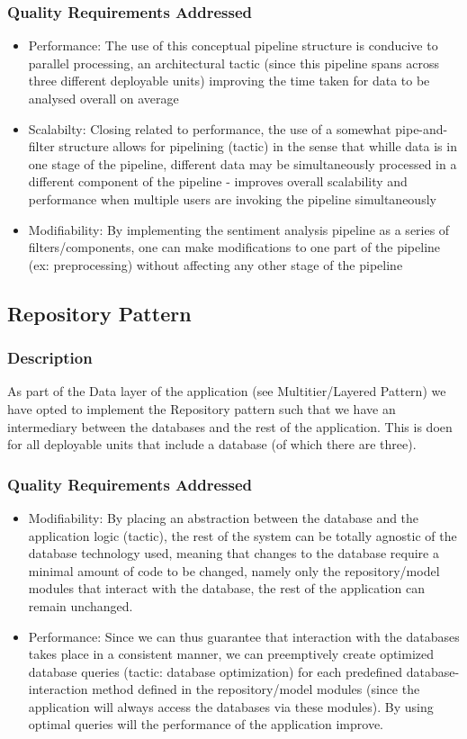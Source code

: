 \documentclass[12pt]{article}
\begin{document}
\subsubsection{Quality Requirements Addressed}
\begin{itemize}
    \item Performance: The use of this conceptual pipeline structure is conducive to parallel processing, an architectural tactic (since this pipeline spans across three different deployable units) improving the time taken for data to be analysed overall on average
    \item Scalabilty: Closing related to performance, the use of a somewhat pipe-and-filter structure allows for pipelining (tactic) in the sense that whille data is in one stage of the pipeline, different data may be simultaneously processed in a different component of the pipeline - improves overall scalability and performance when multiple users are invoking the pipeline simultaneously
    \item Modifiability: By implementing the sentiment analysis pipeline as a series of filters/components, one can make modifications to one part of the pipeline (ex: preprocessing) without affecting any other stage of the pipeline
\end{itemize}
\subsection{Repository Pattern}
\subsubsection{Description}
As part of the Data layer of the application (see Multitier/Layered Pattern) we have opted to implement the Repository pattern such that we have an intermediary between the databases and the rest of the application. This is doen for all deployable units that include a database (of which there are three).
\subsubsection{Quality Requirements Addressed}
\begin{itemize}
    \item Modifiability: By placing an abstraction between the database and the application logic (tactic), the rest of the system can be totally agnostic of the database technology used, meaning that changes to the database require a minimal amount of code to be changed, namely only the repository/model modules that interact with the database, the rest of the application can remain unchanged.
    \item Performance: Since we can thus guarantee that interaction with the databases takes place in a consistent manner, we can preemptively create optimized database queries (tactic: database optimization) for each predefined database-interaction method defined in the repository/model modules (since the application will always access the databases via these modules). By using optimal queries will the performance of the application improve.
\end{itemize}
\end{document}
